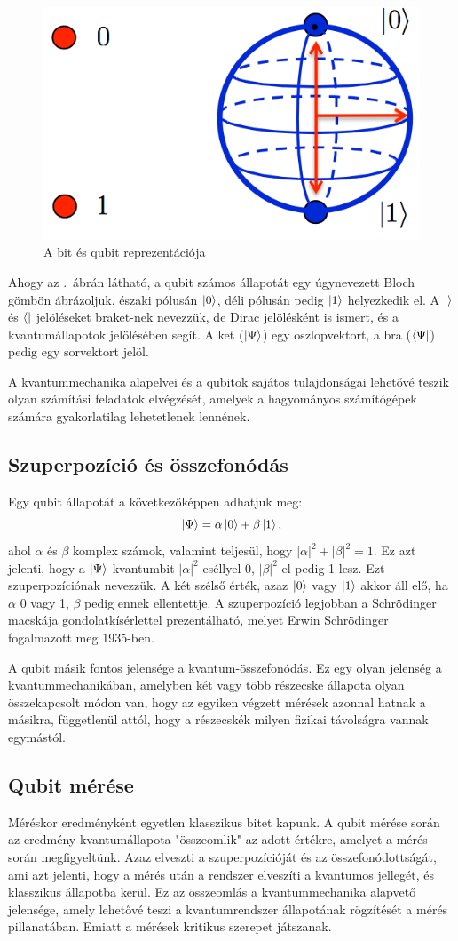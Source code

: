 \documentclass[
]{thesis-ekf}
\theoremstyle{definition}
\theoremstyle{remark}
\begin{document}
\begin{figure}[H]
	\centering
	\includegraphics[width=0.3\linewidth]{bitQubit}
	\caption{A bit és qubit reprezentációja}
	\label{fig:bitqubit}
\end{figure}

Ahogy az \az{\ref{fig:bitqubit}}.~ábrán látható, a qubit számos állapotát egy úgynevezett Bloch gömbön ábrázoljuk, északi pólusán $\ket{0}$, déli pólusán pedig $\ket{1}$ helyezkedik el. A $\ket{}$ és $\bra{}$ jelöléseket braket-nek nevezzük, de Dirac jelölésként is ismert, és a kvantumállapotok jelölésében segít. A ket ($\ket{\Psi}$) egy oszlopvektort, a bra ($\bra{\Psi}$) pedig egy sorvektort jelöl.

A kvantummechanika alapelvei és a qubitok sajátos tulajdonságai lehetővé teszik
olyan számítási feladatok elvégzését, amelyek a hagyományos számítógépek számára gyakorlatilag lehetetlenek lennének.

\subsection{Szuperpozíció és összefonódás}

Egy qubit állapotát a következőképpen adhatjuk meg:
\[ \ket{\Psi}=\alpha\ket{0}+\beta\ket{1}, \]
ahol $\alpha$ és $\beta$ komplex számok, valamint teljesül, hogy $|\alpha|^2+|\beta|^2=1$. Ez azt jelenti, hogy a $\ket{\Psi}$ kvantumbit $|\alpha|^2$ eséllyel 0, $|\beta|^2$-el pedig 1 lesz. Ezt szuperpozíciónak nevezzük. A két szélső érték, azaz $\ket{0}$ vagy $\ket{1}$ akkor áll elő, ha $\alpha$ 0 vagy 1, $\beta$ pedig ennek ellentettje. A szuperpozíció legjobban a Schrödinger macskája gondolatkísérlettel prezentálható, melyet Erwin Schrödinger fogalmazott meg 1935-ben.

A qubit másik fontos jelensége a kvantum-összefonódás. Ez egy olyan jelenség a kvantummechanikában, amelyben két vagy több részecske állapota olyan összekapcsolt módon van, hogy az egyiken végzett mérések azonnal hatnak a másikra, függetlenül attól, hogy a részecskék milyen fizikai távolságra vannak egymástól.

\subsection{Qubit mérése}
Méréskor eredményként egyetlen klasszikus bitet kapunk. A qubit mérése során az eredmény kvantumállapota "összeomlik" az adott értékre, amelyet a mérés során megfigyeltünk. Azaz elveszti a szuperpozícióját és az összefonódottságát, ami azt jelenti, hogy a mérés után a rendszer elveszíti a kvantumos jellegét, és klasszikus állapotba kerül. Ez az összeomlás a kvantummechanika alapvető jelensége, amely lehetővé teszi a kvantumrendszer állapotának rögzítését a mérés pillanatában. Emiatt a mérések kritikus szerepet játszanak.
\end{document}
